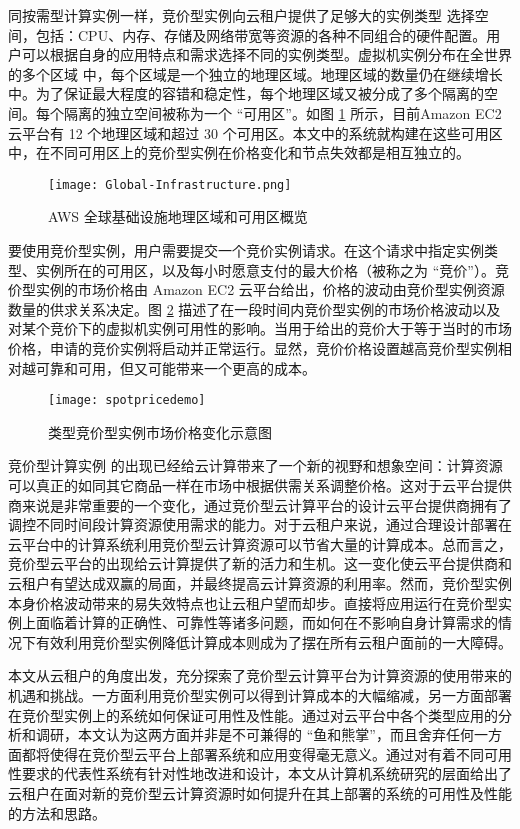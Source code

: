 同按需型计算实例一样，竞价型实例向云租户提供了足够大的实例类型 \cite{AWS_IT:2014} 选择空间，包括：CPU、内存、存储及网络带宽等资源的各种不同组合的硬件配置。用户可以根据自身的应用特点和需求选择不同的实例类型。虚拟机实例分布在全世界的多个区域 \cite{AWS_GI:2014} 中，每个区域是一个独立的地理区域。地理区域的数量仍在继续增长中。为了保证最大程度的容错和稳定性，每个地理区域又被分成了多个隔离的空间。每个隔离的独立空间被称为一个 ``可用区''。如图 \ref{figure:aws-gi} 所示，目前Amazon EC2 云平台有 12 个地理区域和超过 30 个可用区。本文中的系统就构建在这些可用区中，在不同可用区上的竞价型实例在价格变化和节点失效都是相互独立的。
\begin{figure}
  \centering
  \texttt{[image: Global-Infrastructure.png]}
  \caption{AWS 全球基础设施地理区域和可用区概览 \cite{AWS_GI:2014}}
  \label{figure:aws-gi}
\end{figure}

要使用竞价型实例，用户需要提交一个竞价实例请求。在这个请求中指定实例类型、实例所在的可用区，以及每小时愿意支付的最大价格（被称之为 ``竞价''）。竞价型实例的市场价格由 Amazon EC2 云平台给出，价格的波动由竞价型实例资源数量的供求关系决定。图 \ref{figure:spdemo} 描述了在一段时间内竞价型实例的市场价格波动以及对某个竞价下的虚拟机实例可用性的影响。当用于给出的竞价大于等于当时的市场价格，申请的竞价实例将启动并正常运行。显然，竞价价格设置越高竞价型实例相对越可靠和可用，但又可能带来一个更高的成本。
\begin{figure}
  \centering
  \texttt{[image: spotpricedemo]}
  \caption{类型竞价型实例市场价格变化示意图}
  \label{figure:spdemo}
\end{figure}

竞价型计算实例 \cite{SI:2014} 的出现已经给云计算带来了一个新的视野和想象空间：计算资源可以真正的如同其它商品一样在市场中根据供需关系调整价格。这对于云平台提供商来说是非常重要的一个变化，通过竞价型云计算平台的设计云平台提供商拥有了调控不同时间段计算资源使用需求的能力。对于云租户来说，通过合理设计部署在云平台中的计算系统利用竞价型云计算资源可以节省大量的计算成本。总而言之，竞价型云平台的出现给云计算提供了新的活力和生机。这一变化使云平台提供商和云租户有望达成双赢的局面，并最终提高云计算资源的利用率。然而，竞价型实例本身价格波动带来的易失效特点也让云租户望而却步。直接将应用运行在竞价型实例上面临着计算的正确性、可靠性等诸多问题，而如何在不影响自身计算需求的情况下有效利用竞价型实例降低计算成本则成为了摆在所有云租户面前的一大障碍。

本文从云租户的角度出发，充分探索了竞价型云计算平台为计算资源的使用带来的机遇和挑战。一方面利用竞价型实例可以得到计算成本的大幅缩减，另一方面部署在竞价型实例上的系统如何保证可用性及性能。通过对云平台中各个类型应用的分析和调研，本文认为这两方面并非是不可兼得的 ``鱼和熊掌''，而且舍弃任何一方面都将使得在竞价型云平台上部署系统和应用变得毫无意义。通过对有着不同可用性要求的代表性系统有针对性地改进和设计，本文从计算机系统研究的层面给出了云租户在面对新的竞价型云计算资源时如何提升在其上部署的系统的可用性及性能的方法和思路。

